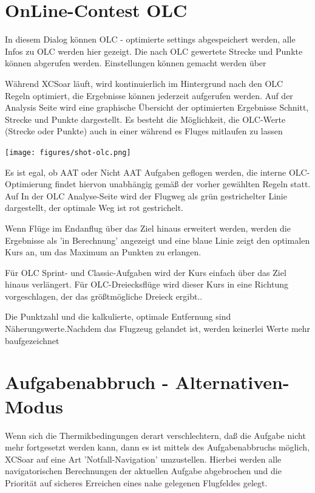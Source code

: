 \section{OnLine-Contest OLC}

In diesem Dialog können OLC - optimierte settings abgespeichert werden, alle Infos zu OLC werden hier gezeigt. Die nach OLC gewertete Strecke und Punkte können abgerufen werden. Einstellungen können gemacht werden über   

Während \textsf{XCSoar} läuft, wird kontinuierlich im Hintergrund nach den OLC Regeln optimiert, die Ergebnisse können  jederzeit  aufgerufen werden.
Auf der Analysis Seite wird eine graphische Übersicht der optimierten Ergebnisse Schnitt, Strecke und Punkte dargestellt.  Es besteht die Möglichkeit, die OLC-Werte (Strecke oder Punkte) auch in einer \infobox während es Fluges mitlaufen zu lassen

\begin{center}
\texttt{[image: figures/shot-olc.png]}
\end{center}

Es ist egal, ob AAT oder Nicht AAT Aufgaben geflogen werden, die interne OLC-Optimierung findet hiervon unabhängig gemäß der vorher gewählten Regeln statt.  Auf In der OLC Analyse-Seite wird der Flugweg als grün gestrichelter Linie dargestellt, der optimale Weg ist rot gestrichelt.

Wenn Flüge im Endanflug über das Ziel hinaus erweitert werden, werden die Ergebnisse als 'in Berechnung' angezeigt und eine blaue Linie zeigt den optimalen Kurs an, um das Maximum an Punkten zu erlangen.

Für OLC Sprint- und Classic-Aufgaben wird der Kurs einfach über das Ziel hinaus verlängert.  Für OLC-Dreiecksflüge wird dieser Kurs in eine Richtung vorgeschlagen, der das größtmögliche Dreieck ergibt.. 

Die Punktzahl und die kalkulierte, optimale Entfernung sind Näherungswerte.Nachdem das Flugzeug gelandet ist, werden keinerlei Werte mehr baufgezeichnet

\section{Aufgabenabbruch - Alternativen-Modus}

Wenn sich die Thermikbedingungen derart verschlechtern, daß die Aufgabe nicht mehr fortgesetzt werden kann,
dann es ist mittels des Aufgabenabbruchs möglich, \textsf{XCSoar} auf eine Art 'Notfall-Navigation' umzustellen.
Hierbei werden alle navigatorischen Berechnungen der aktuellen Aufgabe abgebrochen und die Priorität auf sicheres
Erreichen eines nahe gelegenen Flugfeldes gelegt.

